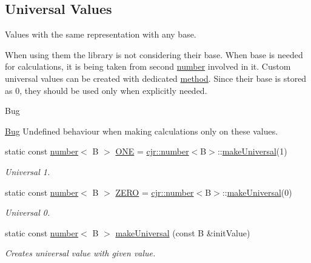 \subsection*{Universal Values}
\label{_amgrpf308c32226026625205207ec76528501}%
Values with the same representation with any base.

When using them the library is not considering their base. When base is needed for calculations, it is being taken from second \hyperlink{classcjr_1_1number}{number} involved in it. Custom universal values can be created with dedicated \hyperlink{classcjr_1_1number_a5f7755ea44ed24ff4a28c96ef5bb3a80}{method}. Since their base is stored as 0, they should be used only when explicitly needed. \begin{DoxyRefDesc}{Bug}
\item[\hyperlink{bug__bug000001}{Bug}]Undefined behaviour when making calculations only on these values. \end{DoxyRefDesc}
\begin{DoxyCompactItemize}
\item 
\hypertarget{classcjr_1_1number_a6327e5cfd5458aff794403400dfe0c13}{static const \hyperlink{classcjr_1_1number}{number}$<$ B $>$ \hyperlink{classcjr_1_1number_a6327e5cfd5458aff794403400dfe0c13}{O\-N\-E} = \hyperlink{classcjr_1_1number}{cjr\-::number}$<$B$>$\-::\hyperlink{classcjr_1_1number_a5f7755ea44ed24ff4a28c96ef5bb3a80}{make\-Universal}(1)}\label{classcjr_1_1number_a6327e5cfd5458aff794403400dfe0c13}

\begin{DoxyCompactList}\small\item\em Universal 1. \end{DoxyCompactList}\item 
\hypertarget{classcjr_1_1number_a0a6d68bdc0fda6943a5d8e0d47fdeb03}{static const \hyperlink{classcjr_1_1number}{number}$<$ B $>$ \hyperlink{classcjr_1_1number_a0a6d68bdc0fda6943a5d8e0d47fdeb03}{Z\-E\-R\-O} = \hyperlink{classcjr_1_1number}{cjr\-::number}$<$B$>$\-::\hyperlink{classcjr_1_1number_a5f7755ea44ed24ff4a28c96ef5bb3a80}{make\-Universal}(0)}\label{classcjr_1_1number_a0a6d68bdc0fda6943a5d8e0d47fdeb03}

\begin{DoxyCompactList}\small\item\em Universal 0. \end{DoxyCompactList}\item 
static const \hyperlink{classcjr_1_1number}{number}$<$ B $>$ \hyperlink{classcjr_1_1number_a5f7755ea44ed24ff4a28c96ef5bb3a80}{make\-Universal} (const B \&init\-Value)
\begin{DoxyCompactList}\small\item\em Creates universal value with given value. \end{DoxyCompactList}\end{DoxyCompactItemize}


